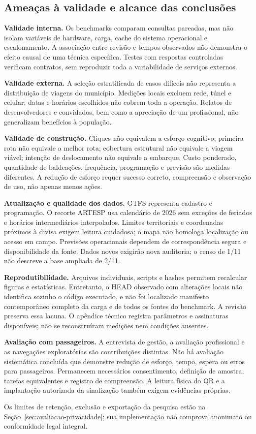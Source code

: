 \subsection{Ameaças à validade e alcance das conclusões}\label{sec:ameacas-validade}
\textbf{Validade interna.} Os benchmarks comparam consultas pareadas, mas não isolam variáveis de hardware, carga, cache do sistema operacional e escalonamento. A associação entre revisão e tempos observados não demonstra o efeito causal de uma técnica específica. Testes com respostas controladas verificam contratos, sem reproduzir toda a variabilidade de serviços externos.

\textbf{Validade externa.} A seleção estratificada de casos difíceis não representa a distribuição de viagens do município. Medições locais excluem rede, túnel e celular; datas e horários escolhidos não cobrem toda a operação. Relatos de desenvolvedores e convidados, bem como a apreciação de um profissional, não generalizam benefícios à população.

\textbf{Validade de construção.} Cliques não equivalem a esforço cognitivo; primeira rota não equivale a melhor rota; cobertura estrutural não equivale a viagem viável; intenção de deslocamento não equivale a embarque. Custo ponderado, quantidade de baldeações, frequência, programação e previsão são medidas diferentes. A redução de esforço requer sucesso correto, compreensão e observação de uso, não apenas menos ações.

\textbf{Atualização e qualidade dos dados.} GTFS representa cadastro e programação. O recorte ARTESP usa calendário de 2026 sem exceções de feriados e horários intermediários interpolados. Limites territoriais e coordenadas próximos à divisa exigem leitura cuidadosa; o mapa não homologa localização ou acesso em campo. Previsões operacionais dependem de correspondência segura e disponibilidade da fonte. Dados novos exigirão nova auditoria; o censo de 1/11 não descreve a base ampliada de 2/11.

\textbf{Reprodutibilidade.} Arquivos individuais, scripts e hashes permitem recalcular figuras e estatísticas. Entretanto, o HEAD observado com alterações locais não identifica sozinho o código executado, e não foi localizado manifesto contemporâneo completo da carga e de todos os fontes do benchmark. A revisão preserva essa lacuna. O apêndice técnico registra parâmetros e assinaturas disponíveis; não se reconstruíram medições nem condições ausentes.

\textbf{Avaliação com passageiros.} A entrevista de gestão, a avaliação profissional e as navegações exploratórias são contribuições distintas. Não há avaliação sistemática concluída que demonstre redução de esforço, tempo, espera ou erros para passageiros. Permanecem necessários consentimento, definição de amostra, tarefas equivalentes e registro de compreensão. A leitura física do QR e a implantação autorizada da sinalização também exigem evidências próprias.

Os limites de retenção, exclusão e exportação da pesquisa estão na Seção~\ref{sec:avaliacao-privacidade}; sua implementação não comprova anonimato ou conformidade legal integral.
